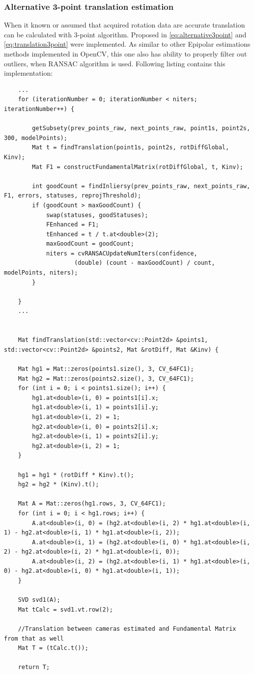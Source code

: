 \subsubsection{Alternative 3-point translation estimation}
When it known or assumed that acquired rotation data are accurate translation can be calculated with 3-point algorithm. Proposed in \ref{eq:alternative3point} and \ref{eq:translation3point} were implemented. As similar to other Epipolar estimations methods implemented in OpenCV, this one also has ability to properly filter out outliers, when RANSAC algorithm is used. Following listing contains this implementation:
\begin{lstlisting}
    ...
    for (iterationNumber = 0; iterationNumber < niters; iterationNumber++) {

        getSubsety(prev_points_raw, next_points_raw, point1s, point2s, 300, modelPoints);
        Mat t = findTranslation(point1s, point2s, rotDiffGlobal, Kinv);
        Mat F1 = constructFundamentalMatrix(rotDiffGlobal, t, Kinv);

        int goodCount = findInliersy(prev_points_raw, next_points_raw, F1, errors, statuses, reprojThreshold);
        if (goodCount > maxGoodCount) {
            swap(statuses, goodStatuses);
            FEnhanced = F1;
            tEnhanced = t / t.at<double>(2);
            maxGoodCount = goodCount;
            niters = cvRANSACUpdateNumIters(confidence,
                    (double) (count - maxGoodCount) / count, modelPoints, niters);
        }

    }
    ...
    
    
    Mat findTranslation(std::vector<cv::Point2d> &points1, std::vector<cv::Point2d> &points2, Mat &rotDiff, Mat &Kinv) {

    Mat hg1 = Mat::zeros(points1.size(), 3, CV_64FC1);
    Mat hg2 = Mat::zeros(points2.size(), 3, CV_64FC1);
    for (int i = 0; i < points1.size(); i++) {
        hg1.at<double>(i, 0) = points1[i].x;
        hg1.at<double>(i, 1) = points1[i].y;
        hg1.at<double>(i, 2) = 1;
        hg2.at<double>(i, 0) = points2[i].x;
        hg2.at<double>(i, 1) = points2[i].y;
        hg2.at<double>(i, 2) = 1;
    }

    hg1 = hg1 * (rotDiff * Kinv).t();
    hg2 = hg2 * (Kinv).t();

    Mat A = Mat::zeros(hg1.rows, 3, CV_64FC1);
    for (int i = 0; i < hg1.rows; i++) {
        A.at<double>(i, 0) = (hg2.at<double>(i, 2) * hg1.at<double>(i, 1) - hg2.at<double>(i, 1) * hg1.at<double>(i, 2));
        A.at<double>(i, 1) = (hg2.at<double>(i, 0) * hg1.at<double>(i, 2) - hg2.at<double>(i, 2) * hg1.at<double>(i, 0));
        A.at<double>(i, 2) = (hg2.at<double>(i, 1) * hg1.at<double>(i, 0) - hg2.at<double>(i, 0) * hg1.at<double>(i, 1));
    }

    SVD svd1(A);
    Mat tCalc = svd1.vt.row(2);

    //Translation between cameras estimated and Fundamental Matrix from that as well
    Mat T = (tCalc.t());

    return T;

\end{lstlisting}
